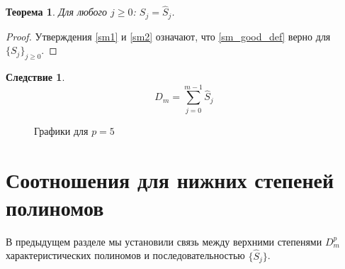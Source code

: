 \documentclass[14pt, a4paper, russian]{report}
\newtheorem{theorem}{\indent Теорема}
\newtheorem{corollary}{\indent Следствие}
\begin{document}
\begin{theorem} \label{subst_th}
Для любого $j \ge 0$: $S_j=\hat{S}_j$.
\end{theorem}
\begin{proof}
Утверждения \cref{sm1} и \cref{sm2} означают, что \cref{sm_good_def} верно для $\{S_j\}_{j \ge 0}$.
\end{proof}
\begin{corollary}\label{D_sum}
$$D_m = \sum\limits_{j=0}^{m-1} \hat{S}_j$$
\end{corollary}
\begin{figure}[H]
    \caption{\footnotesize{Графики для $p = 5$}}
\label{fig:degrees}
\end{figure}

\section{Соотношения для нижних степеней полиномов}

В предыдущем разделе мы установили связь между верхними степенями $D_m^p$ характеристических полиномов и последовательностью $\{\hat{S}_j\}$. 
\end{document}
